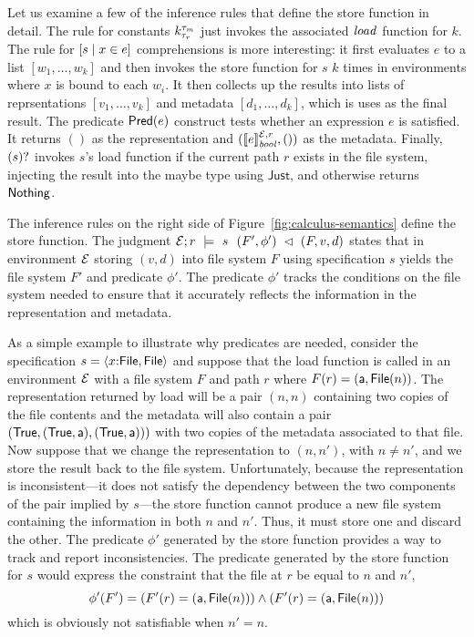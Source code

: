 Let us examine a few of the inference rules that define the store
function in detail. The rule for constants $\Sk$ just invokes the
associated $\loadkname{}$ function for $k$. The rule for
$\SComp{s}{x}{e}$ comprehensions is more interesting: it first
evaluates $e$ to a list $[w_1,\dots,w_k]$ and then invokes the store
function for $s$ $k$ times in environments where $x$ is bound to each
$w_i$. It then collects up the results into lists of reprsentations
$[v_1,\dots,v_k]$ and metadata $[d_1,\dots,d_k]$, which is uses as the
final result. The predicate $\SPred{e}$ construct tests whether an
expression $e$ is satisfied. It returns $()$ as the representation and
$(\eval{e}{\Env,r}{\mathit{bool}},())$ as the metadata. Finally,
$\SOption{s}$ invokes $s$'s load function if the current path $r$
exists in the file system, injecting the result into the maybe type
using $\mathsf{Just}$, and otherwise returns $\Nothing$.

The inference rules on the right side of
Figure~\ref{fig:calculus-semantics} define the store function. The
judgment $\store{\Env}{F}{r}{v,d}{s}{F',\phi'}$ states that in
environment $\Env$ storing $(v,d)$ into file system $F$ using
specification $s$ yields the file system $F'$ and predicate
$\phi'$. The predicate $\phi'$ tracks the conditions on the file
system needed to ensure that it accurately reflects the information in
the representation and metadata.

As a simple example to illustrate why predicates are needed, consider
the specification $s = \SPair{x}{\pfile}{\pfile}$ and suppose that the
load function is called in an environment $\Env$ with a file system
$F$ and path $r$ where $F(r) = (\att,\File{n})$. The representation
returned by load will be a pair $(n,n)$ containing two copies of the
file contents and the metadata will also contain a pair
$(\True,(\True,\att),(\True,\att)))$ with two copies of the metadata
associated to that file. Now suppose that we change the representation
to $(n,n')$, with $n \neq n'$, and we store the result back to the
file system. Unfortunately, because the representation is
inconsistent---it does not satisfy the dependency between the two
components of the pair implied by $s$---the store function cannot
produce a new file system containing the information in both $n$ and
$n'$. Thus, it must store one and discard the other. The predicate
$\phi'$ generated by the store function provides a way to track and
report inconsistencies. The predicate generated by the store function
for $s$ would express the constraint that the file at $r$ be equal to
$n$ and $n'$, 
%
\[
\phi'(F') = (F'(r) = (\att,\File{n})) \wedge (F'(r) = (\att,\File{n}))
\]
%
which is obviously not satisfiable when $n' = n$. 

